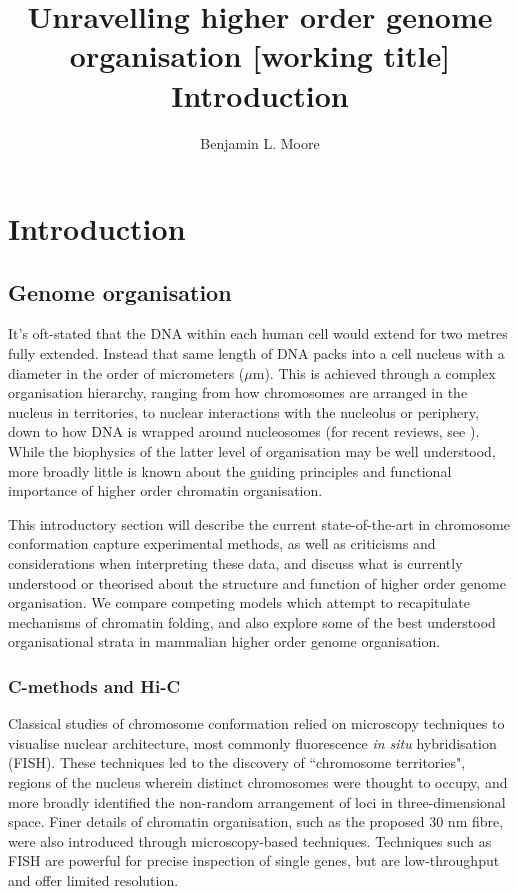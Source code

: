\documentclass[a4paper,11pt,oneside]{book}
\title{ \vspace{3in} Unravelling higher order genome organisation {\small [working
    title]} \\ \vspace{2em} {\large {\bf Introduction}} }
\author{Benjamin L. Moore}
\begin{document}

\chapter{Introduction}
\section{Genome organisation}
%
It's oft-stated that the DNA within each human cell would extend for two metres fully extended. Instead that same length of DNA packs into a cell nucleus with a diameter in the order of micrometers ($\mu$m). This is achieved through a complex organisation hierarchy, ranging from how chromosomes are arranged in the nucleus in territories, to nuclear interactions with the nucleolus or periphery, down to how DNA is wrapped around nucleosomes (for recent reviews, see ). While the biophysics of the latter level of organisation may be well understood, more broadly little is known about the guiding principles and functional importance of higher order chromatin organisation.

This introductory section will describe the current state-of-the-art in chromosome conformation capture experimental methods, as well as criticisms and considerations when interpreting these data, and discuss what is currently understood or theorised about the structure and function of higher order genome organisation. We compare competing models which attempt to recapitulate mechanisms of chromatin folding, and also explore some of the best understood organisational strata in mammalian higher order genome organisation.

%

\subsection{C-methods and Hi-C}

Classical studies of chromosome conformation relied on microscopy techniques to visualise nuclear architecture, most commonly fluorescence \emph{in situ} hybridisation (FISH). These techniques led to the discovery of ``chromosome territories", regions of the nucleus wherein distinct chromosomes were thought to occupy, and more broadly identified the non-random arrangement of loci in three-dimensional space.\cite{DeWit2012, VanSteensel2010} Finer details of chromatin organisation, such as the proposed 30 nm fibre, were also introduced through microscopy-based techniques. Techniques such as FISH are powerful for precise inspection of single genes, but are low-throughput and offer limited resolution.\cite{DeWit2012}
\end{document}
